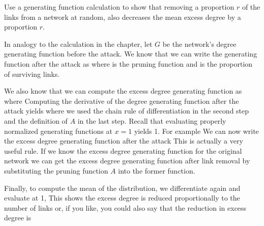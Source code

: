
\label{exAttackExcessReduce}Use a generating function calculation to show that removing a proportion $r$ of the links from a network at random, also decreases the mean excess degree by a proportion $r$. 

\solution
In analogy to the calculation in the chapter, let $G$ be the network's degree generating function before the attack. We know that we can write the generating function after the attack as 
where 
is the pruning function and
is the proportion of surviving links. 

We also know that we can compute the excess degree generating function as 
where 
Computing the derivative of the degree generating function after the attack yields  
where we used the chain rule of differentiation in the second step and the definition of $A$ in the last step. Recall that evaluating properly normalized generating functions at $x=1$ yields 1. For example 
We can now write the excess degree generating function after the attack
This is actually a very useful rule. If we know the excess degree generating function for the original network we can get the excess degree generating function after link removal by substituting the pruning function $A$ into the former function.  

Finally, to compute the mean of the distribution, we differentiate again and evaluate at 1,
This shows the excess degree is reduced proportionally to the number of links or, if you like, you could also say that the reduction in excess degree is 
